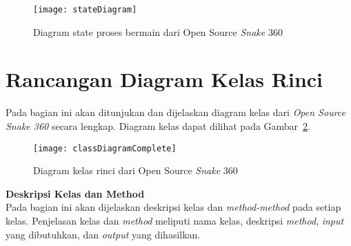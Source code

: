 \begin{figure}[H]
	\centering  
	\texttt{[image: stateDiagram]}  
	\caption[Diagram state proses bermain dari Open Source \textit{Snake} 360]{Diagram state proses bermain dari Open Source \textit{Snake} 360}
	\label{fig:stateDiagram} 
\end{figure}

\section{Rancangan Diagram Kelas Rinci}
Pada bagian ini akan ditunjukan dan dijelaskan diagram kelas dari \textit{Open Source Snake 360} secara lengkap. Diagram kelas dapat dilihat pada Gambar~\ref{fig:classDiagramComplete}.

\begin{figure}[H]
	\centering  
	\texttt{[image: classDiagramComplete]}  
	\caption[Diagram class rinci dari Open Source \textit{Snake} 360]{Diagram kelas rinci dari Open Source \textit{Snake} 360}
	\label{fig:classDiagramComplete} 
\end{figure}

\textbf{Deskripsi Kelas dan Method}\\

Pada bagian ini akan dijelaskan deskripsi kelas dan \textit{method-method} pada setiap kelas. Penjelasan kelas dan \textit{method} meliputi nama kelas, deskripsi \textit{method}, \textit{input} yang dibutuhkan, dan \textit{output} yang dihasilkan. 

